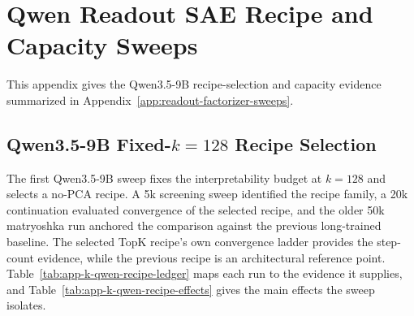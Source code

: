 
\section{Qwen Readout SAE Recipe and Capacity Sweeps}
\label{app:readout-factorizer-qwen-sweeps}

This appendix gives the Qwen3.5-9B recipe-selection and capacity evidence
summarized in Appendix~\ref{app:readout-factorizer-sweeps}.

\subsection{Qwen3.5-9B Fixed-\texorpdfstring{$k=128$}{k=128} Recipe Selection}
\label{app:readout-factorizer-qwen-recipe}

The first Qwen3.5-9B sweep fixes the interpretability budget at $k=128$ and
selects a no-PCA recipe. A 5k screening sweep identified the recipe family, a
20k continuation evaluated convergence of the selected recipe, and the older 50k
matryoshka run \citep{bussmann2025matryoshka} anchored the comparison against
the previous long-trained baseline. The selected TopK recipe's own convergence ladder provides the
step-count evidence, while the previous recipe is an architectural
reference point. Table~\ref{tab:app-k-qwen-recipe-ledger} maps each run to
the evidence it supplies, and Table~\ref{tab:app-k-qwen-recipe-effects}
gives the main effects the sweep isolates.

